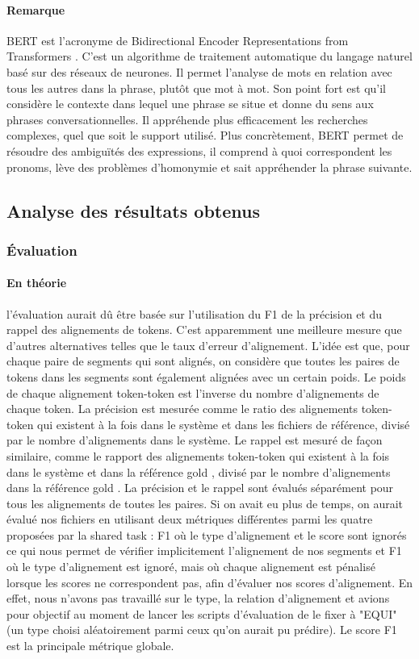\documentclass[a4paper, twoside, 11pt]{article}
\begin{document}
\paragraph{Remarque}
 BERT est l’acronyme de \og Bidirectional Encoder Representations from Transformers \fg{}. C’est un algorithme de traitement automatique du langage naturel basé sur des réseaux de neurones. Il permet l’analyse de mots en relation avec tous les autres dans la phrase, plutôt que mot à mot. Son point fort est qu’il considère le contexte dans lequel une phrase se situe et donne du sens aux phrases conversationnelles. Il appréhende plus efficacement les recherches complexes, quel que soit le support utilisé. Plus concrètement, BERT permet de résoudre des ambiguïtés des expressions, il comprend à quoi correspondent les pronoms, lève des problèmes d’homonymie et sait appréhender la phrase suivante.

 \subsection{Analyse des résultats obtenus}
 \subsubsection{Évaluation}
 \paragraph{En théorie}
 l'évaluation aurait dû être basée sur l'utilisation du F1 de la précision et du rappel des alignements de tokens. C'est apparemment une meilleure mesure que d'autres alternatives telles que le taux d'erreur d'alignement. L'idée est que, pour chaque paire de segments qui sont alignés, on considère que toutes les paires de tokens dans les segments sont également alignées avec un certain poids. Le poids de chaque alignement token-token est l'inverse du nombre d'alignements de chaque token. La précision est mesurée comme le ratio des alignements token-token qui existent à la fois dans le système et dans les fichiers de référence, divisé par le nombre d'alignements dans le système. Le rappel est mesuré de façon similaire, comme le rapport des alignements token-token qui existent à la fois dans le système et dans la référence \og gold \fg{}, divisé par le nombre d'alignements dans la référence \og gold \fg{}. La précision et le rappel sont évalués séparément pour tous les alignements de toutes les paires. Si on avait eu plus de temps, on aurait évalué nos fichiers en utilisant deux métriques différentes parmi les quatre proposées par la \og shared task\fg{} : F1 où le type d'alignement et le score sont ignorés ce qui nous permet de vérifier implicitement l'alignement de nos segments et F1 où le type d'alignement est ignoré, mais où chaque alignement est pénalisé lorsque les scores ne correspondent pas, afin d'évaluer nos scores d'alignement. En effet, nous n'avons pas travaillé sur le type, la relation d'alignement et avions pour objectif au moment de lancer les scripts d'évaluation de le fixer à "EQUI" (un type choisi aléatoirement parmi ceux qu'on aurait pu prédire). Le score F1 est la principale métrique globale.
\end{document}
